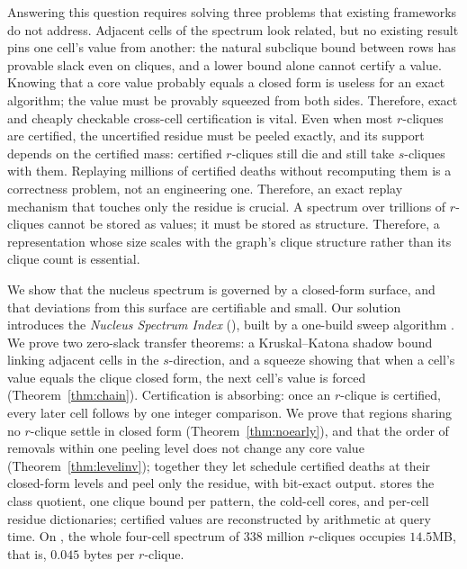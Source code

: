 Answering this question requires solving three problems that existing frameworks do not address.
%
Adjacent cells of the spectrum look related, but no existing result pins one cell's value from another: the natural subclique bound between rows has provable slack even on cliques, and a lower bound alone cannot certify a value.
%
Knowing that a core value probably equals a closed form is useless for an exact algorithm; the value must be provably squeezed from both sides.
%
Therefore, exact and cheaply checkable cross-cell certification is vital.
%
Even when most $r$-cliques are certified, the uncertified residue must be peeled exactly, and its support depends on the certified mass: certified $r$-cliques still die and still take $s$-cliques with them.
%
Replaying millions of certified deaths without recomputing them is a correctness problem, not an engineering one.
%
Therefore, an exact replay mechanism that touches only the residue is crucial.
%
A spectrum over trillions of $r$-cliques cannot be stored as values; it must be stored as structure.
%
Therefore, a representation whose size scales with the graph's clique structure rather than its clique count is essential.

We show that the nucleus spectrum is governed by a closed-form surface, and that deviations from this surface are certifiable and small.
%
Our solution introduces the \textit{Nucleus Spectrum Index} (\nsi), built by a one-build sweep algorithm \specnd.
%
We prove two zero-slack transfer theorems: a Kruskal--Katona shadow bound linking adjacent cells in the $s$-direction, and a squeeze showing that when a cell's value equals the clique closed form, the next cell's value is forced (Theorem~\ref{thm:chain}).
%
Certification is absorbing: once an $r$-clique is certified, every later cell follows by one integer comparison.
%
We prove that regions sharing no $r$-clique settle in closed form (Theorem~\ref{thm:noearly}), and that the order of removals within one peeling level does not change any core value (Theorem~\ref{thm:levelinv}); together they let \specnd{} schedule certified deaths at their closed-form levels and peel only the residue, with bit-exact output.
%
\nsi{} stores the class quotient, one clique bound per pattern, the cold-cell cores, and per-cell residue dictionaries; certified values are reconstructed by arithmetic at query time.
%
On \daWIT{}, the whole four-cell spectrum of $338$ million $r$-cliques occupies $14.5$MB, that is, $0.045$ bytes per $r$-clique.

